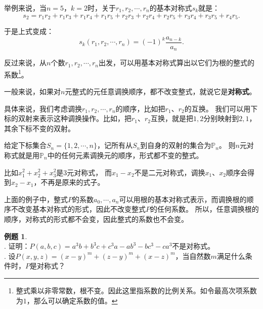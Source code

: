 \documentclass[12pt,UTF8]{ctexbook}
\theoremstyle{definition}
\newtheorem{et}{例题}[section]
\theoremstyle{plain}
\begin{document}
举例来说，当$n=5$，$k=2$时，关于$r_1, r_2, \cdots , r_n$的基本对称式$s_{k}$就是：
$$ s_{2} = r_1r_2 + r_1r_3 + r_1r_4 + r_1r_5 + r_2r_3 + r_2r_4 + r_2r_5 + r_3r_4 + r_3r_5 + r_4r_5.$$

于是上式变成：
$$ s_{k}(r_1, r_2, \cdots , r_n) = (-1)^k \frac{a_{n-k}}{a_n}. $$

反过来说，从$n$个数$r_1, r_2, \cdots , r_n$出发，可以用基本对称式算出以它们为根的整式的系数\footnote{整式乘以非零常数，根不变。因此这里指系数的比例关系。如令最高次项系数为$1$，那么可以确定系数的值。}。

一般来说，如果对$n$元整式的元任意调换顺序，都不改变整式，就说它是\textbf{对称式}。

具体来说，我们考虑调换$r_1, r_2, \cdots , r_n$的顺序，比如把$r_1$、$r_2$的互换。
我们可以用下标的双射来表示这种调换操作。比如，把$r_1$、$r_2$互换，就是把$1,2$分别映射到$2,1$，其余下标不变的双射。

给定下标集合$S_n = \{1, 2, \cdots , n\}$，记所有从$S_n$到自身的双射的集合为$\mathbb{P}_n$。
则$n$元对称式就是用$\mathbb{P}_n$中的任何元素调换元的顺序，形式都不变的整式。

比如$x_1^2 + x_2^2 + x_3^2$是$3$元对称式，
而$x_1 - x_2$不是二元对称式，调换$x_1$、$x_2$顺序会得到$x_2 - x_1$，不再是原来的式子。

上面的例子中，整式$P$的系数$a_0, \cdots, a_n$可以用根的基本对称式表示，而调换根的顺序不改变基本对称式的形式，因此不改变整式$P$的任何系数。
所以，任意调换根的顺序，对称式的形式都不会变，因此整式的系数也不会变。

\begin{et}
    \mbox{} \\
    . 证明：$P(a, b, c) = a^3b + b^3c + c^3a - ab^3 - bc^3 - ca^3$不是对称式。\\
    . 设$P(x, y, z) = (x - y)^m + (z - y)^m + (x - z)^m$，当自然数$m$满足什么条件时，$P$是对称式？\\
\end{et}
\end{document}
